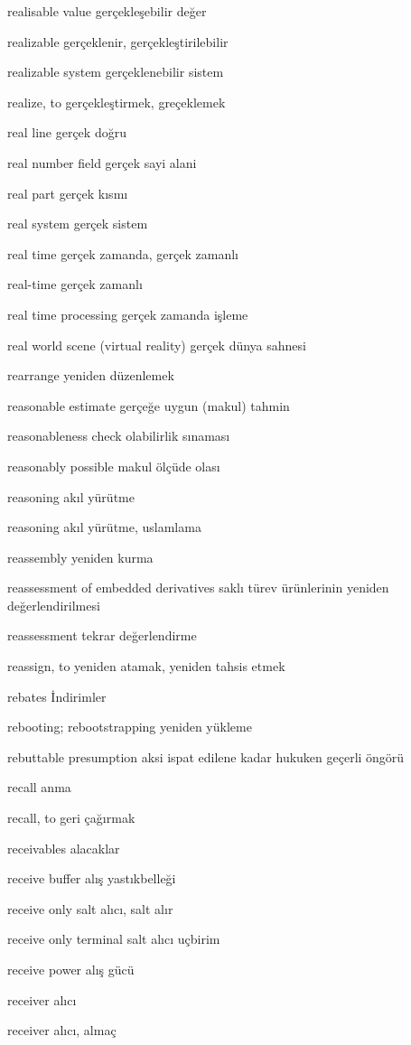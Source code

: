 \documentclass[12pt,fleqn]{article}\usepackage{../../common}
\begin{document}
realisable value gerçekleşebilir değer

realizable gerçeklenir, gerçekleştirilebilir

realizable system gerçeklenebilir sistem

realize, to gerçekleştirmek, greçeklemek

real line gerçek doğru

real number field gerçek sayi alani

real part gerçek kısmı

real system gerçek sistem

real time gerçek zamanda, gerçek zamanlı

real-time gerçek zamanlı

real time processing gerçek zamanda işleme

real world scene (virtual reality) gerçek dünya sahnesi

rearrange yeniden düzenlemek

reasonable estimate gerçeğe uygun (makul) tahmin

reasonableness check olabilirlik sınaması

reasonably possible makul ölçüde olası

reasoning akıl yürütme

reasoning akıl yürütme, uslamlama

reassembly yeniden kurma

reassessment of embedded derivatives saklı türev ürünlerinin yeniden değerlendirilmesi

reassessment tekrar değerlendirme

reassign, to yeniden atamak, yeniden tahsis etmek

rebates İndirimler

rebooting; rebootstrapping yeniden yükleme

rebuttable presumption aksi ispat edilene kadar hukuken geçerli öngörü

recall anma

recall, to geri çağırmak

receivables alacaklar

receive buffer alış yastıkbelleği

receive only salt alıcı, salt alır

receive only terminal salt alıcı uçbirim

receive power alış gücü

receiver alıcı

receiver alıcı, almaç
\end{document}
